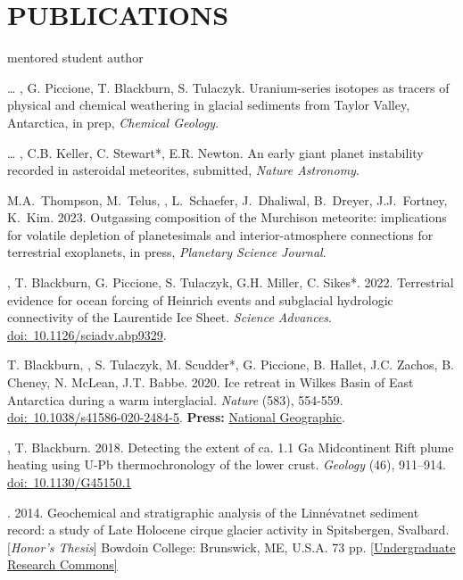 \section*{PUBLICATIONS}
\hfill* mentored student author
\newcommand{\inprep}[1]{in prep, \textit{#1}}
\newcommand{\submitted}[1]{submitted, \textit{#1}}
\newcommand{\inreview}[1]{in review, \textit{#1}}
\newcommand{\inpress}[1]{in press, \textit{#1}}
\newcommand{\doi}[1]{\href{https://doi.org/#1}{doi:~#1}}

\begin{etaremune} [itemsep=4pt, leftmargin=3ex]
\item[\dots] \ghedwards, G. Piccione, T. Blackburn,  S. Tulaczyk. Uranium-series isotopes as tracers of physical and chemical weathering in glacial sediments from Taylor Valley, Antarctica, \inprep{Chemical Geology}.
\item[\dots] \ghedwards, C.B. Keller, C. Stewart*, E.R. Newton. An early giant planet instability recorded in asteroidal meteorites, \submitted{Nature Astronomy}.
\item M.A.~Thompson, M.~Telus, \ghedwards, L.~Schaefer, J.~Dhaliwal, B.~Dreyer, J.J.~Fortney, K.~Kim. 2023. Outgassing composition of the Murchison meteorite: implications for volatile depletion of planetesimals and interior-atmosphere connections for terrestrial exoplanets, \inpress{Planetary Science Journal}. 
\item \ghedwards, T. Blackburn, G. Piccione, S. Tulaczyk, G.H. Miller, C. Sikes*. 2022. Terrestrial evidence for ocean forcing of Heinrich events and subglacial hydrologic connectivity of the Laurentide Ice Sheet. \textit{Science Advances}. \doi{10.1126/sciadv.abp9329}.
\item T. Blackburn, \ghedwards, S. Tulaczyk, M. Scudder*, G. Piccione, B. Hallet, J.C. Zachos, B. Cheney, N. McLean, J.T. Babbe. 2020. Ice retreat in Wilkes Basin of East Antarctica during a warm interglacial. \textit{Nature} (583), 554-559. \doi{10.1038/s41586-020-2484-5}. \textbf{Press:} \href{https://www.nationalgeographic.com/science/2020/07/east-antarctic-ice-sheet-more-vulnerable-to-melting-than-thought/}{National Geographic}.
\item \ghedwards, T. Blackburn. 2018. Detecting the extent of ca. 1.1 Ga Midcontinent Rift plume heating using U-Pb thermochronology of the lower crust. \textit{Geology} (46), 911–914. \doi{10.1130/G45150.1} 
\item \ghedwards. 2014. Geochemical and stratigraphic analysis of the Linnévatnet sediment record: a study of Late Holocene cirque glacier activity in Spitsbergen, Svalbard. [\textit{Honor’s Thesis}] Bowdoin College: Brunswick, ME, U.S.A. 73 pp. \href{https://digitalcommons.bowdoin.edu/honorsprojects/12/}{[Undergraduate Research Commons]}
\end{etaremune}